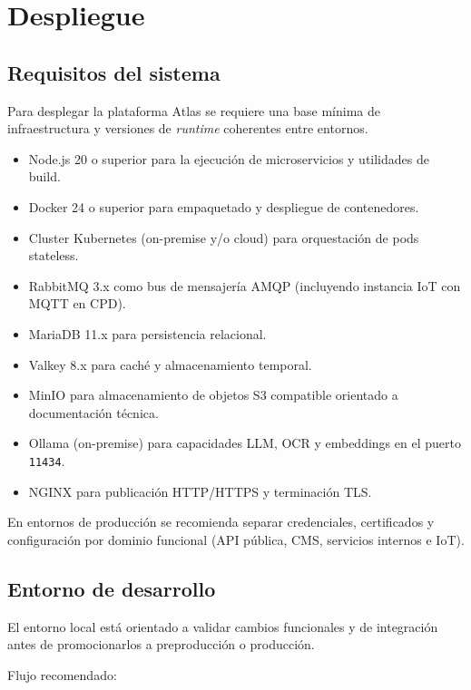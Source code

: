 \chapter{Despliegue}
\label{cap:despliegue}

\section{Requisitos del sistema}

Para desplegar la plataforma Atlas se requiere una base mínima de infraestructura y versiones de \textit{runtime} coherentes entre entornos.

\begin{itemize}
\item Node.js 20 o superior para la ejecución de microservicios y utilidades de build.
\item Docker 24 o superior para empaquetado y despliegue de contenedores.
\item Cluster Kubernetes (on-premise y/o cloud) para orquestación de pods stateless.
\item RabbitMQ 3.x como bus de mensajería AMQP (incluyendo instancia IoT con MQTT en CPD).
\item MariaDB 11.x para persistencia relacional.
\item Valkey 8.x para caché y almacenamiento temporal.
\item MinIO para almacenamiento de objetos S3 compatible orientado a documentación técnica.
\item Ollama (on-premise) para capacidades LLM, OCR y embeddings en el puerto \texttt{11434}.
\item NGINX para publicación HTTP/HTTPS y terminación TLS.
\end{itemize}

En entornos de producción se recomienda separar credenciales, certificados y configuración por dominio funcional (API pública, CMS, servicios internos e IoT).

\section{Entorno de desarrollo}

El entorno local está orientado a validar cambios funcionales y de integración antes de promocionarlos a preproducción o producción.

Flujo recomendado:


